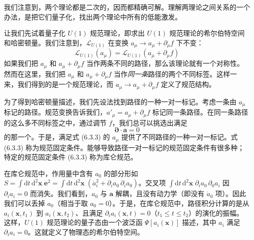 我们注意到，两个理论都是二次的，因而都精确可解。理解两理论之间关系的一个办法，是把它们量子化，找出两个理论中所有的低能激发。

让我们先试着量子化 $U(1)$ 规范理论，即求出 $U(1)$ 规范理论的希尔伯特空间和哈密顿量。我们注意到，$\mathcal{L}_{U(1)}$ 在变换 $a_\mu \to a_\mu + \partial_\mu f$ 下不变：
\begin{equation*}
\mathcal{L}_{U(1)}(a_\mu) = \mathcal{L}_{U(1)}(a_\mu + \partial_\mu f)
\end{equation*}
如果我们把 $a_\mu$ 和 $a_\mu + \partial_\mu f$ 当作两条不同的路径，那么该理论就有一个对称性。然而在这里，我们把 $a_\mu$ 和 $a_\mu + \partial_\mu f$ 当作\emph{同一条}路径的两个不同标签。这样一来，我们得到的是一个规范理论，而 $a_\mu \to a_\mu + \partial_\mu f$ 定义了规范结构。

为了得到哈密顿量描述，我们先设法找到路径的一种一对一标记。考虑一条由 $a_\mu$ 标记的路径。规范变换告诉我们，$a'_\mu = a_\mu + \partial_\mu f$ 标记同一条路径。在同一条路径的这么多不同标签之中，通过调节 $f$，我们总可以挑选出满足
\begin{equation*}
\pmb{\partial} \cdot \pmb{a} = 0\tag{6.3.3}
\end{equation*}
的那一个。于是，满足式 (6.3.3) 的 $a_\mu$ 提供了不同路径的一种一对一标记。式 (6.3.3) 称为规范固定条件。能够导致路径一对一标记的规范固定条件有很多种；特定的规范固定条件 (6.3.3) 称为库仑规范。

在库仑规范中，作用量中含有 $a_0$ 的部分形如 $S = \int \mathrm{d}t\,\mathrm{d}^2\pmb{x}\; \pmb{e}^2 = \int \mathrm{d}t\,\mathrm{d}^2\pmb{x}\; (\dot{a}_i^2 + \partial_i a_0\, \partial_i a_0)$。交叉项 $\int \mathrm{d}t\,\mathrm{d}^2\pmb{x}\; \partial_i a_0\, \partial_0 a_i$ 因 $\partial_i a_i = 0$ 而消失。我们看到，$a_0$ 与 $\pmb{a}$ 解耦，且没有动力学（即没有 $\dot{a}_0$ 项）。因此我们可以丢掉 $a_0$（相当于取 $a_0 = 0$）。于是，在库仑规范中，路径积分计算的是从 $a_i(\pmb{x}, t_1)$ 到 $a_i(\pmb{x}, t_2)$、且满足 $\partial_i a_i(\pmb{x}, t) = 0$（$t_1 \leqslant t \leqslant t_2$）的演化的振幅。这样，$U(1)$ 规范理论的量子态由一个波泛函 $\Psi[a_i(\pmb{x})]$ 描述，其中 $a_i$ 满足 $\partial_i a_i = 0$。这就定义了物理态的希尔伯特空间。

